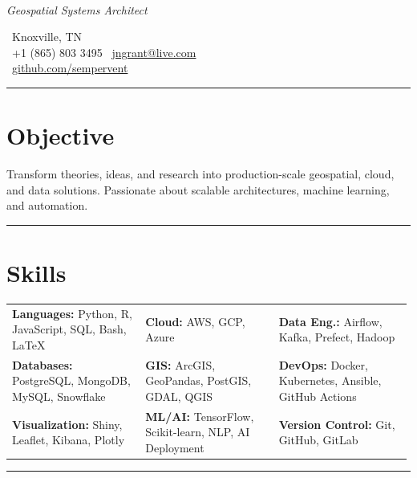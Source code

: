 \documentclass[11pt]{article}
\newcommand{\name}[2]{\makecell[l]{{\huge #1 \textbf{#2}}}}
\newcommand{\contact}[4]{%
    \faMapMarker \, #1 \\
    \faPhone \, #2 \quad
    \faEnvelope \, \href{mailto:#3}{#3} \\
    \faGithub \, \href{#4}{#4}
}
\newcommand{\objective}[1]{\section*{\faBullseye{} Objective} \vspace{-0.5em} \begin{center} #1 \end{center}}
\newcommand{\skills}[2]{\textbf{#1:} #2}
\begin{document}

\noindent
\begin{minipage}{0.5\linewidth}
    \name{Joshua N.}{Grant} \\
    \textit{Geospatial Systems Architect}
\end{minipage}
\hfill
\begin{minipage}{0.5\linewidth}
    \raggedleft
    \contact{Knoxville, TN}{+1 (865) 803 3495}{jngrant@live.com}{github.com/sempervent}
\end{minipage}

\noindent\rule{\textwidth}{0.5pt}

\objective{Transform theories, ideas, and research into production-scale geospatial, cloud, and data solutions. Passionate about scalable architectures, machine learning, and automation.}

\noindent\rule{\textwidth}{0.5pt}

\section*{\faCogs{} Skills}
\begin{tabularx}{\linewidth}{@{}p{0.33\linewidth} p{0.33\linewidth} p{0.33\linewidth}@{}}
    \skills{Languages}{Python, R, JavaScript, SQL, Bash, \LaTeX} &
    \skills{Cloud}{AWS, GCP, Azure} &
    \skills{Data Eng.}{Airflow, Kafka, Prefect, Hadoop} \\

    \skills{Databases}{PostgreSQL, MongoDB, MySQL, Snowflake} &
    \skills{GIS}{ArcGIS, GeoPandas, PostGIS, GDAL, QGIS} &
    \skills{DevOps}{Docker, Kubernetes, Ansible, GitHub Actions} \\

    \skills{Visualization}{Shiny, Leaflet, Kibana, Plotly} &
    \skills{ML/AI}{TensorFlow, Scikit-learn, NLP, AI Deployment} &
    \skills{Version Control}{Git, GitHub, GitLab} \\
\end{tabularx}

\noindent\rule{\textwidth}{0.5pt}

\end{document}
